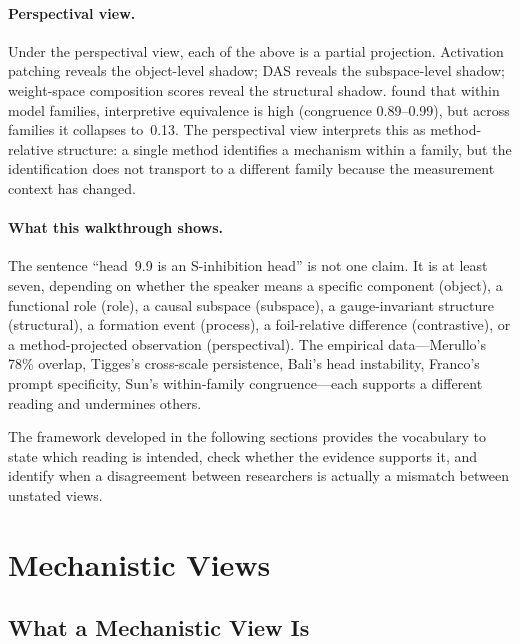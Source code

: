 \documentclass{article}
\begin{document}
\paragraph{Perspectival view.}
Under the perspectival view, each of the above is a partial projection.
Activation patching reveals the object-level shadow; DAS reveals the
subspace-level shadow; weight-space composition scores reveal the
structural shadow.  \citet{sun2026} found that within model families,
interpretive equivalence is high (congruence 0.89--0.99), but across
families it collapses to~0.13.  The perspectival view interprets this
as method-relative structure: a single method identifies a mechanism
within a family, but the identification does not transport to a
different family because the measurement context has changed.

\paragraph{What this walkthrough shows.}
The sentence ``head~9.9 is an S-inhibition head'' is not one claim.
It is at least seven, depending on whether the speaker means a
specific component (object), a functional role (role), a causal
subspace (subspace), a gauge-invariant structure (structural), a
formation event (process), a foil-relative difference (contrastive),
or a method-projected observation (perspectival).  The empirical
data---Merullo's 78\% overlap, Tigges's cross-scale persistence,
Bali's head instability, Franco's prompt specificity, Sun's
within-family congruence---each supports a different reading and
undermines others.

The framework developed in the following sections provides the
vocabulary to state which reading is intended, check whether the
evidence supports it, and identify when a disagreement between
researchers is actually a mismatch between unstated views.


\section{Mechanistic Views}\label{sec:views}

\subsection{What a Mechanistic View Is}
\end{document}

